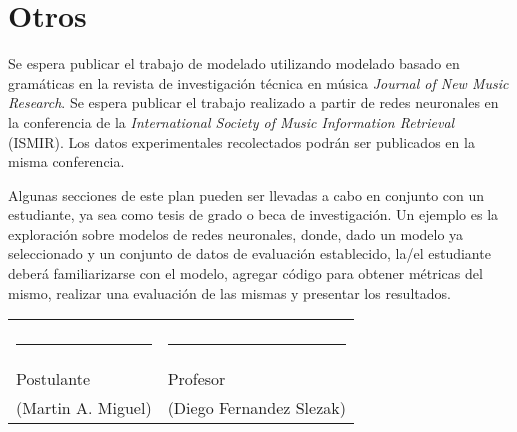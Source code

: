 \documentclass[a4paper,11pt]{article}
\begin{document}
\section*{Otros}

Se espera publicar el trabajo de modelado utilizando modelado basado en
gramáticas en la revista de investigación técnica en música \emph{Journal of
New Music Research}. Se espera publicar el trabajo realizado a partir de
redes neuronales en la conferencia de la \emph{International Society of Music
  Information Retrieval} (ISMIR). Los datos experimentales recolectados podrán
  ser publicados en la misma conferencia.

Algunas secciones de este plan pueden ser llevadas a cabo en conjunto con un
estudiante, ya sea como tesis de grado o beca de investigación. Un ejemplo es
la exploración sobre modelos de redes neuronales, donde, dado un modelo ya
seleccionado y un conjunto de datos de evaluación establecido, la/el estudiante
deberá familiarizarse con el modelo, agregar código para obtener métricas del
mismo, realizar una evaluación de las mismas y presentar los resultados.

\noindent\begin{tabular}{p{} p{}}
    \vspace{2cm} & \\
       \rule[0pt]{2in}{0.5pt} & 
        \rule[0pt]{2in}{0.5pt}\\
        Postulante & Profesor \\
        (Martin A. Miguel) &  (Diego Fernandez Slezak)
        \end{tabular}


{\small


}
\end{document}
